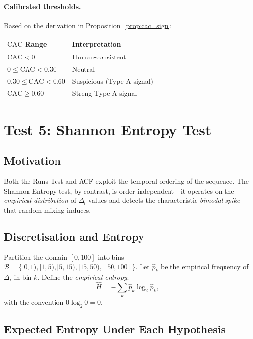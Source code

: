 \documentclass[11pt,a4paper]{article}
\newcommand{\CAC}{\mathrm{CAC}}
\begin{document}
\paragraph{Calibrated thresholds.}
Based on the derivation in Proposition~\ref{prop:cac_sign}:
\begin{center}
\begin{tabular}{ll}
\toprule
$\CAC$ Range & Interpretation \\
\midrule
$\CAC < 0$ & Human-consistent \\
$0 \leq \CAC < 0.30$ & Neutral \\
$0.30 \leq \CAC < 0.60$ & Suspicious (Type A signal) \\
$\CAC \geq 0.60$ & Strong Type A signal \\
\bottomrule
\end{tabular}
\end{center}

\section{Test 5: Shannon Entropy Test}
\label{sec:entropy}

\subsection{Motivation}

Both the Runs Test and ACF exploit the temporal ordering of the sequence.
The Shannon Entropy test, by contrast, is order-independent---it operates
on the \emph{empirical distribution} of $\Delta_i$ values and detects
the characteristic \emph{bimodal spike} that random mixing induces.

\subsection{Discretisation and Entropy}

Partition the domain $[0, 100]$ into bins
$\mathcal{B} = \{[0,1), [1,5), [5,15), [15,50), [50,100]\}$.
Let $\hat{p}_k$ be the empirical frequency of $\Delta_i$ in bin $k$.
Define the \emph{empirical entropy}:
\begin{equation}
  \hat{H} = -\sum_{k} \hat{p}_k \log_2 \hat{p}_k,
  \label{eq:entropy}
\end{equation}
with the convention $0 \log_2 0 = 0$.

\subsection{Expected Entropy Under Each Hypothesis}
\end{document}
